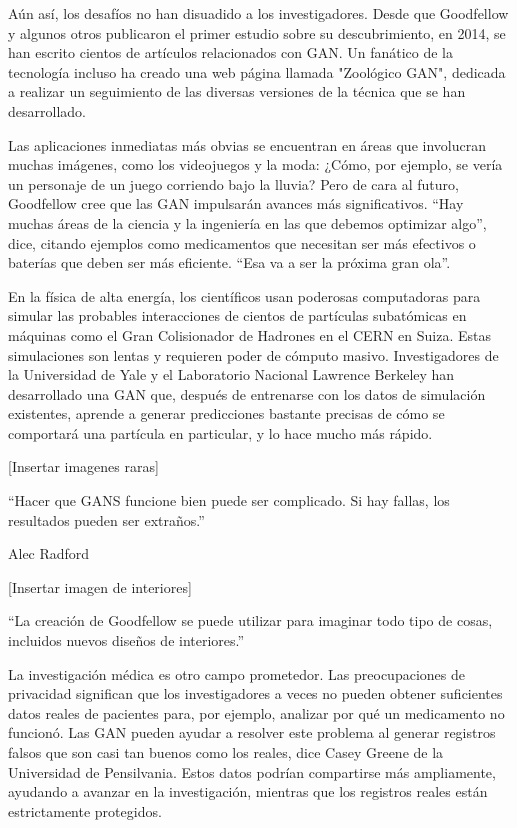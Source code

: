 \documentclass[a4paper]{article}
\begin{document}
Aún así, los desafíos no han disuadido a los investigadores. Desde que Goodfellow y algunos 
otros publicaron el primer estudio sobre su descubrimiento, en 2014, se han escrito cientos 
de artículos relacionados con GAN. Un fanático de la tecnología incluso ha creado una web
página llamada "Zoológico GAN", dedicada a realizar un seguimiento de las diversas versiones 
de la técnica que se han desarrollado.

Las aplicaciones inmediatas más obvias se encuentran en áreas que involucran muchas imágenes, 
como los videojuegos y la moda: ¿Cómo, por ejemplo, se vería un personaje de un juego corriendo 
bajo la lluvia? Pero de cara al futuro, Goodfellow cree que las GAN impulsarán avances más 
significativos. “Hay muchas áreas de la ciencia y la ingeniería en las que debemos
optimizar algo”, dice, citando ejemplos como medicamentos que necesitan ser más efectivos 
o baterías que deben ser más eficiente. ``Esa va a ser la próxima gran ola''.

En la física de alta energía, los científicos usan poderosas computadoras para simular las 
probables interacciones de cientos de partículas subatómicas en máquinas como el Gran 
Colisionador de Hadrones en el CERN en Suiza. Estas simulaciones son lentas y requieren 
poder de cómputo masivo. Investigadores de la Universidad de Yale y el Laboratorio 
Nacional Lawrence Berkeley han desarrollado una GAN que, después de entrenarse con los 
datos de simulación existentes, aprende a generar predicciones bastante precisas de cómo 
se comportará una partícula en particular, y lo hace mucho más rápido.

[Insertar imagenes raras]

``Hacer que GANS funcione bien puede ser complicado. Si hay fallas, los resultados pueden ser 
extraños.''

\begin{flushright}
Alec Radford
\end{flushright}


[Insertar imagen de interiores]

``La creación de Goodfellow se puede utilizar para imaginar todo tipo de cosas, incluidos nuevos 
diseños de interiores.''



{\ttfamily
La investigación médica es otro campo prometedor. Las preocupaciones de privacidad significan que 
los investigadores a veces no pueden obtener suficientes datos reales de pacientes para, por 
ejemplo, analizar por qué un medicamento no funcionó. Las GAN pueden ayudar a resolver este 
problema al generar registros falsos que son casi tan buenos como los reales, dice Casey Greene 
de la Universidad de Pensilvania. Estos datos podrían compartirse más ampliamente, ayudando a 
avanzar en la investigación, mientras que los registros reales están estrictamente protegidos. }
\end{document}
